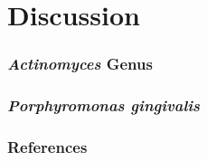 \documentclass{beamer}
\begin{document}
    \section{Discussion}
    \begin{frame}
        \frametitle{\textit{Actinomyces} Genus}
    \end{frame}

    \begin{frame}
        \frametitle{\textit{Porphyromonas gingivalis}}
    \end{frame}

    \begin{frame}[allowframebreaks]
        \frametitle{References}
        
        
    \end{frame}
\end{document}
